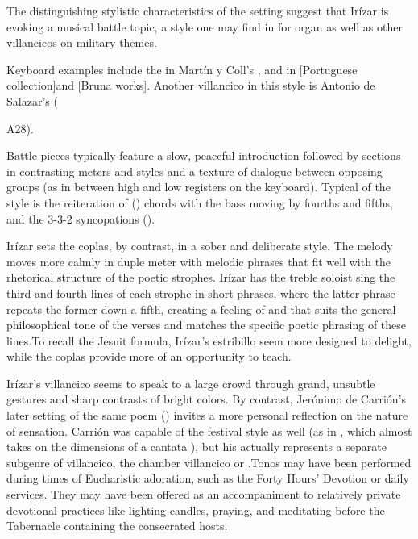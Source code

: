 The distinguishing stylistic characteristics of the setting suggest that Irízar is evoking a musical battle topic, a style one may find in  for organ as well as other villancicos on military themes.%
  \begin{Footnote}
  \XXX
  Keyboard examples include the  in Martín y Coll's \XXX, and in [Portuguese collection]\XXX and [Bruna works]\XXX.
  Another villancico in this style is Antonio de Salazar's  (\signature{MEX-Mc}{A28}).
  \end{Footnote}
Battle pieces typically feature a slow, peaceful introduction followed by sections in contrasting meters and styles and a texture of dialogue between opposing groups (as in between high and low registers on the keyboard). 
Typical of the style is the reiteration of  () chords with the bass moving by fourths and fifths, and the 3-3-2 syncopations ().

Irízar sets the coplas, by contrast, in a sober and deliberate style.
The melody moves more calmly in duple meter with melodic phrases that fit well with the rhetorical structure of the poetic strophes. 
Irízar has the treble soloist sing the third and fourth lines of each strophe in short phrases, where the latter phrase repeats the former down a fifth, creating a feeling of  and  that suits the general philosophical tone of the verses and matches the specific poetic phrasing of these lines.\citXXX[example]
To recall the Jesuit formula, Irízar's estribillo seem more designed to delight, while the coplas provide more of an opportunity to teach.

Irízar's villancico seems to speak to a large crowd through grand, unsubtle gestures and sharp contrasts of bright colors.
By contrast, Jerónimo de Carrión's later setting of the same poem () invites a more personal reflection on the nature of sensation.
Carrión was capable of the festival style as well (as in , which almost takes on the dimensions of a cantata \XXX[signature]), but his  actually represents a separate subgenre of villancico, the chamber villancico or .
Tonos may have been performed during times of Eucharistic adoration, such as the Forty Hours' Devotion or daily  services.
They may have been offered as an accompaniment to relatively private devotional practices like lighting candles, praying, and meditating before the Tabernacle containing the consecrated hosts.


